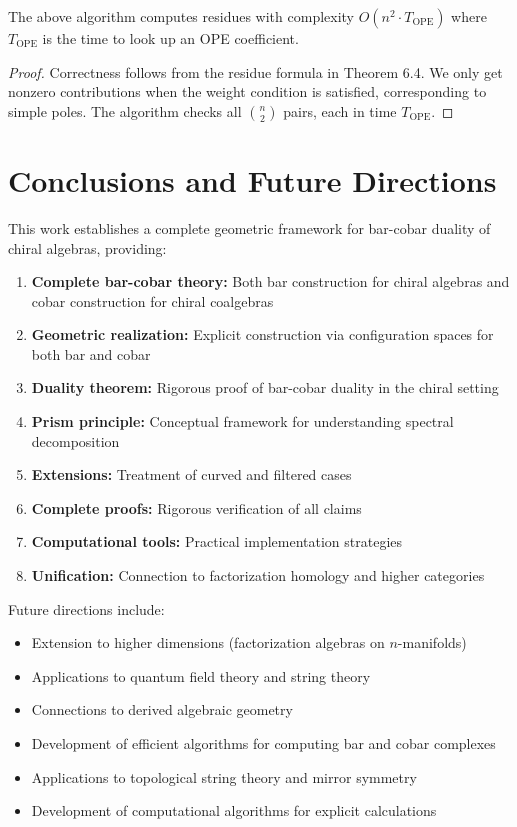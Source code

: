  
\begin{proposition}
The above algorithm computes residues with complexity $O(n^2 \cdot T_{\text{OPE}})$ where $T_{\text{OPE}}$ is the time to look up an OPE coefficient.
\end{proposition}
 
\begin{proof}
Correctness follows from the residue formula in Theorem 6.4. We only get nonzero contributions when the weight condition is satisfied, corresponding to simple poles. The algorithm checks all $\binom{n}{2}$ pairs, each in time $T_{\text{OPE}}$.
\end{proof}
 
\section{Conclusions and Future Directions}
 
This work establishes a complete geometric framework for bar-cobar duality of chiral algebras, providing:

\begin{enumerate}
\item \textbf{Complete bar-cobar theory:} Both bar construction for chiral algebras and cobar construction for chiral coalgebras
\item \textbf{Geometric realization:} Explicit construction via configuration spaces for both bar and cobar
\item \textbf{Duality theorem:} Rigorous proof of bar-cobar duality in the chiral setting
\item \textbf{Prism principle:} Conceptual framework for understanding spectral decomposition
\item \textbf{Extensions:} Treatment of curved and filtered cases
\item \textbf{Complete proofs:} Rigorous verification of all claims
\item \textbf{Computational tools:} Practical implementation strategies
\item \textbf{Unification:} Connection to factorization homology and higher categories
\end{enumerate}

Future directions include:
\begin{itemize}
\item Extension to higher dimensions (factorization algebras on $n$-manifolds)
\item Applications to quantum field theory and string theory
\item Connections to derived algebraic geometry
\item Development of efficient algorithms for computing bar and cobar complexes
\item Applications to topological string theory and mirror symmetry
\item Development of computational algorithms for explicit calculations
\end{itemize}
 
